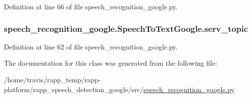 Definition at line 66 of file speech\-\_\-recognition\-\_\-google.\-py.

\hypertarget{classspeech__recognition__google_1_1SpeechToTextGoogle_a706a8904bbb7ae3e7431250323b559d6}{
\subsubsection[{serv\-\_\-topic}]{\setlength{\rightskip}{0pt plus 5cm}speech\-\_\-recognition\-\_\-google.\-Speech\-To\-Text\-Google.\-serv\-\_\-topic}}\label{classspeech__recognition__google_1_1SpeechToTextGoogle_a706a8904bbb7ae3e7431250323b559d6}


Definition at line 62 of file speech\-\_\-recognition\-\_\-google.\-py.



The documentation for this class was generated from the following file\-:\begin{DoxyCompactItemize}
\item 
/home/travis/rapp\-\_\-temp/rapp-\/platform/rapp\-\_\-speech\-\_\-detection\-\_\-google/src/\hyperlink{speech__recognition__google_8py}{speech\-\_\-recognition\-\_\-google.\-py}\end{DoxyCompactItemize}
